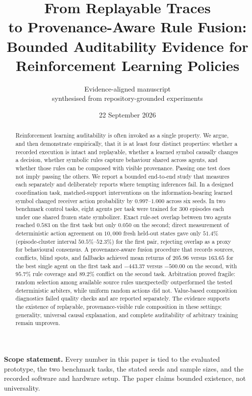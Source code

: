 \documentclass[11pt,a4paper]{article}
\title{From Replayable Traces\\ to Provenance-Aware Rule Fusion:\\
Bounded Auditability Evidence for Reinforcement Learning Policies}
\author{Evidence-aligned manuscript\\ synthesised from repository-grounded experiments}
\date{22 September 2026}
\theoremstyle{definition}
\begin{document}
\maketitle

\begin{abstract}
Reinforcement learning auditability is often invoked as a single property.
We argue, and then demonstrate empirically, that it is at least four distinct
properties: whether a recorded execution is intact and replayable, whether a
learned symbol causally changes a decision, whether symbolic rules capture
behaviour shared across agents, and whether those rules can be composed with
visible provenance. Passing one test does not imply passing the others.
We report a bounded end-to-end study that measures each separately and
deliberately reports where tempting inferences fail. In a designed
coordination task, matched-support interventions on the information-bearing
learned symbol changed receiver action probability by $0.997$--$1.000$ across
six seeds. In two benchmark control tasks, eight agents per task were trained
for $300$ episodes each under one shared frozen state symbolizer. Exact
rule-set overlap between two agents reached $0.583$ on the first task but only
$0.050$ on the second; direct measurement of deterministic action agreement on
$10{,}000$ fresh held-out states gave only $51.4\%$ (episode-cluster interval
$50.5\%$--$52.3\%$) for the first pair, rejecting overlap as a proxy for
behavioural consensus. A provenance-aware fusion procedure that records
sources, conflicts, blind spots, and fallbacks achieved mean returns of
$205.96$ versus $163.65$ for the best single agent on the first task and
$-443.37$ versus $-500.00$ on the second, with $95.7\%$ rule coverage and
$89.2\%$ conflict on the second task. Arbitration proved fragile: random
selection among available source rules unexpectedly outperformed the tested
deterministic arbiters, while uniform random actions did not. Value-based
composition diagnostics failed quality checks and are reported separately.
The evidence supports the existence of replayable, provenance-visible
rule composition in these settings; generality, universal causal explanation,
and complete auditability of arbitrary training remain unproven.
\end{abstract}

\noindent\textbf{Scope statement.}
Every number in this paper is tied to the evaluated prototype, the two
benchmark tasks, the stated seeds and sample sizes, and the recorded software
and hardware setup. The paper claims bounded existence, not universality.
\end{document}
